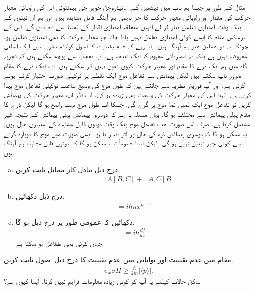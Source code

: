 مثال کے طور پر جیسا ہم باب  میں دیکھیں گے.  ہائیڈروجن جوہر جی ہیملٹونی اس کی زاویائی معیار حرکت کی مقدار اور زاویائی معیار حرکت کا  جز باہمی ہم آہنگ قابل مشاہدہ ہیں. اور ہم ان تینوں کے بیک وقت امتیازی تفاعل تیار لر لے انہیں متعلقہ امتیازی اقدار کے لحاظ سے نام دیں گے. اس کے برعکس مقام کا ایسے کوئی امتیازی تفاعل نہیں پایا جاتا جو معیار حرکت کا بھی امتیازی تفاعل ہو. چونکہ یہ دو عملین غیر ہم آہنگ ہیں. یاد رہے کہ عدم یقینیت کا اصول کوانٹم نظریہ میں ایک اضافی مفروضہ نہیں ہے بلکہ یہ شماریاتی مفہوم کا ایک نتیجہ ہے. آپ تعجب سے پوچھ سکتے ہیں کہ تجربہ گاہ میں ہم ایک ذرے کا مقام اور معیار حرکت کیوں تعین نہیں کر سکتے ہیں. آپ ایک ذرے کا مقام ضرور ناپ سکتے ہیں لیکن پیمائش سے تفاعل موج ایک نقطے پر نوکیلی صورت اختیار کرتے ہوئے گرتی ہے. اور آپ فوریئر نظریہ سے جانتے ہیں کہ طول موج کی وسیع ساعت نوکیلی تفاعل موج پیدا کرتی ہے. لہذا اس کی معیار حرکت کی وسعت بھی زیادہ ہو گی. اب اگر آپ معیار حرکت کی پیمائش کریں تو تفاعل موج ایک لمبی  نما موج پر گرے گی. جسکا اب طول موج بہت واضح ہو گا لیکن ذرے کا مقام پہلی پیمائش سے مختلف ہو گا. یہاں مسئلہ یہ ہے کہ دوسری پیمائش پہلی پیمائش کے نتیجہ غیر مشتمل کرتا ہے. صرف اس صورت جب تفاعل موج بیک وقت دونوں قابل مشاہدہ کے امتیازی حال ہوں, یہ ممکن ہو گا کہ دوسری پیمائش ذرہ کی حال پر اثر انداز نا ہو. ایسی صورت میں موج کا دوبارہ گرنے سے کوئی چیز تبدیل نہیں ہو گی. لیکن ایسا عموماً تب ممکن ہو گا کہ دونوں قابل مشاہدہ ہم آہنگ ہوں.
\begin{enumerate}[a.]
\item درج ذیل تبادل کار مماثل ثابت کریں.
\begin{align}
[ AB,C ] = A[B,C] + [A,C]B
\end{align}
\item درج ذیل دکھائیں. 
\begin{align*}
[x^{n},p] = i\hbar nx^{n-1}
\end{align*}
\item دکھائیں کہ عمومی طور پر درج ذیل ہو گا. 
\begin{align}
[f(x) , p] = i\hbar \frac{df}{dx}
\end{align}
جہاں   کوئی بھی طفاعل ہو سکتا ہے.
\end{enumerate}
مقام  میں عدم یقینیت اور توانائی   میں عدم یقینیت کا درج ذیل اصول ثابت کریں.
\begin{align*}
\sigma_{x}\sigma{H} \geq \frac{\hbar}{2m}|\langle p \rangle |.
\end{align*}
ساکن حالات کیلئے یہ آپ کو کوئی زیادہ معلومات فراہم نہیں کرتا, ایسا کیوں ہے؟
